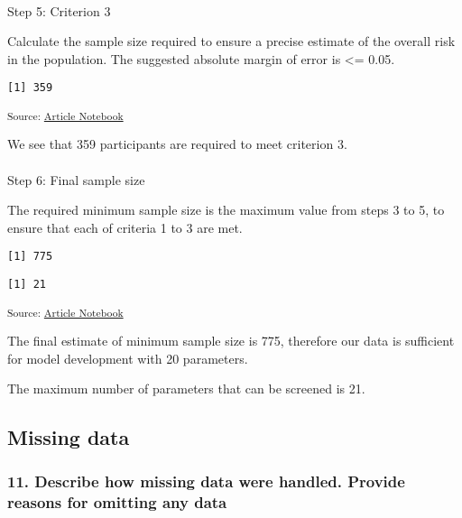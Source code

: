 \documentclass[
  letterpaper,
  DIV=11,
  numbers=noendperiod]{scrartcl}
\makeatletter
\let\oldparagraph\paragraph
\renewcommand{\paragraph}{
    \@ifstar
      \xxxParagraphStar
      \xxxParagraphNoStar
  }
\newcommand{\xxxParagraphStar}[1]{\oldparagraph*{#1}\mbox{}}
\newcommand{\xxxParagraphNoStar}[1]{\oldparagraph{#1}\mbox{}}
\makeatother
\begin{document}
\paragraph{Step 5: Criterion 3}\label{step-5-criterion-3}

Calculate the sample size required to ensure a precise estimate of the
overall risk in the population. The suggested absolute margin of error
is \textless= 0.05.

\begin{verbatim}
[1] 359
\end{verbatim}

\textsubscript{Source:
\href{https://AnTangQuoc.github.io/LZD-TP-pred-model/index.qmd.html}{Article
Notebook}}

We see that 359 participants are required to meet criterion 3.

\paragraph{Step 6: Final sample size}\label{step-6-final-sample-size}

The required minimum sample size is the maximum value from steps 3 to 5,
to ensure that each of criteria 1 to 3 are met.

\begin{verbatim}
[1] 775
\end{verbatim}

\begin{verbatim}
[1] 21
\end{verbatim}

\textsubscript{Source:
\href{https://AnTangQuoc.github.io/LZD-TP-pred-model/index.qmd.html}{Article
Notebook}}

The final estimate of minimum sample size is 775, therefore our data is
sufficient for model development with 20 parameters.

The maximum number of parameters that can be screened is 21.

\subsection{Missing data}\label{missing-data}

\subsubsection{11. Describe how missing data were handled. Provide
reasons for omitting any
data}\label{describe-how-missing-data-were-handled.-provide-reasons-for-omitting-any-data}
\end{document}
